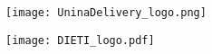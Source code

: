 \pagecolor{TERTIARY}\afterpage{\nopagecolor}
\begin{titlepage}
  \begin{center}
    \vspace*{0.8cm}
    \Huge
    \textbf{\maintitle{}}

    \vspace*{0.5cm}

    \color{SECONDARY}
    \large
    \textbf{\authors{}}
    
    \vfill

    \texttt{[image: UninaDelivery\_logo.png]}
    
    \vfill

    \vspace*{0.5cm}
    \texttt{[image: DIETI\_logo.pdf]}
    \vspace*{-0.5cm}
  \end{center}
\end{titlepage}